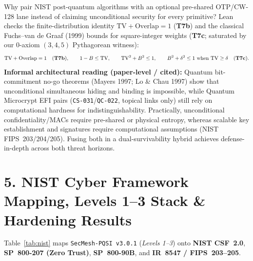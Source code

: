 \documentclass[10pt,letterpaper]{article}
\newcommand{\code}[1]{\texttt{\fontsize{7.8pt}{9.2pt}\selectfont #1}}
\begin{document}
\begin{tcolorbox}[tealbox, title={Interpretation B --- Classical Bounds Behind Hybrid PQ+PSI Design (Fuchs--van de Graaf 1999; Cores T7b \& T7c)}]
Why pair NIST post-quantum algorithms with an optional pre-shared OTP/CW-128 lane instead of claiming unconditional security for every primitive? Lean checks the finite-distribution identity $\mathrm{TV} + \mathrm{Overlap} = 1$ (\textbf{T7b}) and the classical Fuchs--van de Graaf (1999) bounds for square-integer weights (\textbf{T7c}; saturated by our 0-axiom $(3,4,5)$ Pythagorean witness):
{\setlength{\abovedisplayskip}{2.5pt}\setlength{\belowdisplayskip}{2.5pt}
\[
  \mathrm{TV} + \mathrm{Overlap} = 1 \quad(\text{\textbf{T7b}}),
  \qquad
  1 - B \le \mathrm{TV}, \qquad \mathrm{TV}^2 + B^2 \le 1, \qquad B^2 + \delta^2 \le 1 \text{ when } \mathrm{TV}\ge\delta \quad(\text{\textbf{T7c}}).
\]}
\textbf{Informal architectural reading (paper-level / cited):} Quantum bit-commitment no-go theorems (Mayers 1997; Lo \& Chau 1997) show that unconditional simultaneous hiding and binding is impossible, while Quantum Microcrypt EFI pairs (\code{CS-031}/\code{QC-022}, topical links only) still rely on computational hardness for indistinguishability. Practically, unconditional confidentiality/MACs require pre-shared or physical entropy, whereas scalable key establishment and signatures require computational assumptions (NIST FIPS~203/204/205). Fusing both in a dual-survivability hybrid achieves defense-in-depth across both threat horizons.
\end{tcolorbox}

\newpage
\section{5. NIST Cyber Framework Mapping, Levels 1--3 Stack \& Hardening Results}
Table~\ref{tab:nist} maps \code{SecMesh-PQSI v3.0.1} (\emph{Levels 1--3}) onto \textbf{NIST CSF~2.0}, \textbf{SP~800-207 (Zero Trust)}, \textbf{SP~800-90B}, and \textbf{IR~8547 / FIPS~203--205}.
\end{document}
